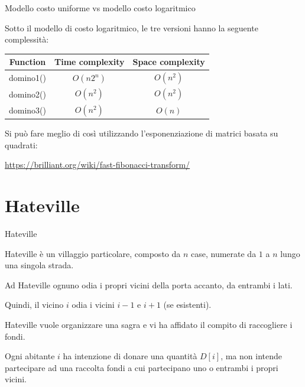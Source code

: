 \begin{frame}{Modello costo uniforme vs modello costo logaritmico}
  
Sotto il modello di costo logaritmico, le tre versioni hanno la seguente
complessità:

\bigskip  
\begin{center}
\begin{tabular}{|c|c|c|}
\hline
\textbf{Function} & \textbf{Time complexity} & \textbf{Space complexity} \\\hline
\textsf{domino1()} & $O(n2^n)$ & $O(n^2)$ \\\hline
\textsf{domino2()} & $O(n^2)$ & $O(n^2)$ \\\hline
\textsf{domino3()} & $O(n^2)$ & $O(n)$ \\\hline
\end{tabular}
\end{center}

\bigskip
Si può fare meglio di così utilizzando l'esponenziazione di matrici basata
su quadrati:

\bigskip
\url{https://brilliant.org/wiki/fast-fibonacci-transform/}


\end{frame}

\section{Hateville}

\begin{frame}{Hateville}

\BIL
\item Hateville è un villaggio particolare, composto da $n$ case, numerate da $1$ a 
$n$ lungo una singola strada. 

\item Ad Hateville ognuno odia i propri vicini della 
porta accanto, da entrambi i lati.
\item Quindi, il vicino $i$ odia i vicini $i-1$ e $i+1$ (se esistenti). 

\item Hateville vuole organizzare una sagra e vi 
ha affidato il compito di raccogliere i fondi. 

\item Ogni abitante $i$ ha intenzione
di  donare una quantità $D[i]$, ma non intende partecipare ad una raccolta 
fondi a cui partecipano uno o entrambi i propri vicini. 

\EIL

\end{frame}


